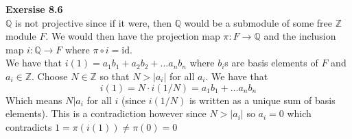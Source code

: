 \documentclass[12pt]{article}
\newenvironment{ques}[1]{\textbf{Exersise #1}\vspace{1 mm}\\ }{\bigskip}
\theoremstyle{definition}
\newcommand{\Q}{\mathbb Q}
\newcommand{\Z}{\mathbb Z}
\newcommand{\id}{\text{id}}
\begin{document}
\begin{ques}{8.6}
	$\Q$ is not projective since if it were, then $\Q$ would be a submodule of
	some free $\Z$ module $F$. We would then have the projection map $\pi : F
	\to \Q$ and the inclusion map $i: \Q \to F$ where $\pi \circ i = \id$.\\
	We have that $i(1) = a_1b_1 + a_2b_2 + \dots a_nb_n$ where $b_i$s are basis
	elements of $F$ and $a_i \in \Z$. Choose $N \in \Z$ so that $N > |a_i|$ for
	all $a_i$. We have that
	$$i(1) = N\cdot i(1/N) = a_1b_1 + \dots a_nb_n$$
	Which means $N | a_i$ for all $i$ (since $i(1/N)$ is written as a unique
	sum of basis elements). This is a contradiction however since $N > |a_i|$
	so $a_i = 0$ which contradicts $1 = \pi(i(1)) \neq \pi(0) = 0$
\end{ques}
\end{document}
